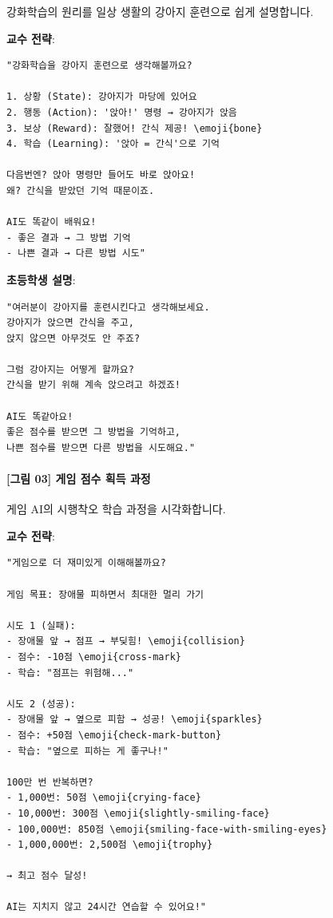 \documentclass[a4paper, 11pt]{article}
\begin{document}
강화학습의 원리를 일상 생활의 강아지 훈련으로 쉽게 설명합니다.

\textbf{교수 전략}:

\begin{verbatim}
"강화학습을 강아지 훈련으로 생각해볼까요?

1. 상황 (State): 강아지가 마당에 있어요
2. 행동 (Action): '앉아!' 명령 → 강아지가 앉음
3. 보상 (Reward): 잘했어! 간식 제공! \emoji{bone}
4. 학습 (Learning): '앉아 = 간식'으로 기억

다음번엔? 앉아 명령만 들어도 바로 앉아요!
왜? 간식을 받았던 기억 때문이죠.

AI도 똑같이 배워요!
- 좋은 결과 → 그 방법 기억
- 나쁜 결과 → 다른 방법 시도"
\end{verbatim}

\textbf{초등학생 설명}:

\begin{verbatim}
"여러분이 강아지를 훈련시킨다고 생각해보세요.
강아지가 앉으면 간식을 주고,
앉지 않으면 아무것도 안 주죠?

그럼 강아지는 어떻게 할까요?
간식을 받기 위해 계속 앉으려고 하겠죠!

AI도 똑같아요!
좋은 점수를 받으면 그 방법을 기억하고,
나쁜 점수를 받으면 다른 방법을 시도해요."
\end{verbatim}

\hypertarget{uxadf8uxb9bc-20-uxac8cuxc784-uxc810uxc218-uxd68duxb4dd-uxacfcuxc815}{%
\paragraph{\texorpdfstring{\textbf{{[}그림 03{]} 게임 점수 획득 과정}
}{{[}그림 03{]} 게임 점수 획득 과정 }}\label{uxadf8uxb9bc-20-uxac8cuxc784-uxc810uxc218-uxd68duxb4dd-uxacfcuxc815}}

게임 AI의 시행착오 학습 과정을 시각화합니다.

\textbf{교수 전략}:

\begin{verbatim}
"게임으로 더 재미있게 이해해볼까요?

게임 목표: 장애물 피하면서 최대한 멀리 가기

시도 1 (실패):
- 장애물 앞 → 점프 → 부딪힘! \emoji{collision}
- 점수: -10점 \emoji{cross-mark}
- 학습: "점프는 위험해..."

시도 2 (성공):
- 장애물 앞 → 옆으로 피함 → 성공! \emoji{sparkles}
- 점수: +50점 \emoji{check-mark-button}
- 학습: "옆으로 피하는 게 좋구나!"

100만 번 반복하면?
- 1,000번: 50점 \emoji{crying-face}
- 10,000번: 300점 \emoji{slightly-smiling-face}
- 100,000번: 850점 \emoji{smiling-face-with-smiling-eyes}
- 1,000,000번: 2,500점 \emoji{trophy}

→ 최고 점수 달성!

AI는 지치지 않고 24시간 연습할 수 있어요!"
\end{verbatim}
\end{document}
